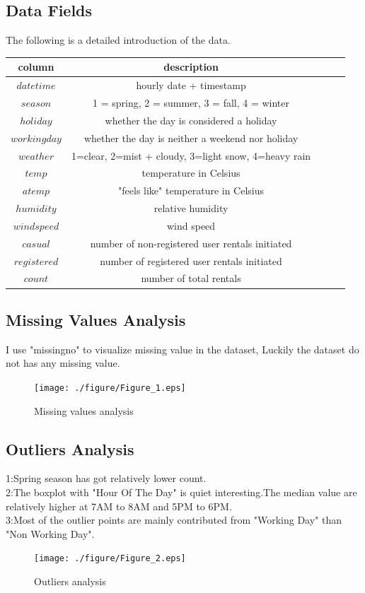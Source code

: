 \subsection{Data Fields}
The following is a detailed introduction of the data.\\
\begin{tabular}{c| c c c c }
	\toprule
	\textbf{column} & \textbf{description}  \\
	\midrule
	$datetime$ &  {hourly date + timestamp }\\
	$season$ &  {1 = spring, 2 = summer, 3 = fall, 4 = winter} \\
	$holiday$ &  {whether the day is considered a holiday} \\
	$workingday$ &  {whether the day is neither a weekend nor holiday} \\
	$weather$ &  {1=clear, 2=mist + cloudy, 3=light snow, 4=heavy rain} \\
	$temp$ & {temperature in Celsius} \\
	$atemp$ & {"feels like" temperature in Celsius} \\
	$humidity$ & {relative humidity} \\
	$windspeed$ & {wind speed} \\
	$casual$ & {number of non-registered user rentals initiated} \\
	$registered$ & {number of registered user rentals initiated} \\
	$count$ & {number of total rentals} \\
	\bottomrule
\end{tabular}

\subsection{Missing Values Analysis}
I use "missingno" to visualize missing value in the dataset, Luckily the dataset do not has any missing value.\\
\begin{figure}[htbp]
	\texttt{[image: ./figure/Figure\_1.eps]}
	\caption{Missing values analysis}
\end{figure}

\subsection{Outliers Analysis}
1:Spring season has got relatively lower count. \\
2:The boxplot with "Hour Of The Day" is quiet interesting.The median value are relatively higher at 7AM to 8AM and 5PM to 6PM.\\
3:Most of the outlier points are mainly contributed from "Working Day" than "Non Working Day". 
\begin{figure}[htbp]
	\texttt{[image: ./figure/Figure\_2.eps]}
	\caption{Outliers analysis}
\end{figure}

